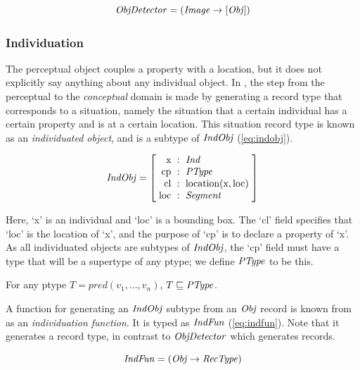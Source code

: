 \begin{equation}\label{eq:objdetector}
\mathit{ObjDetector} = ( \mathit{Image} \rightarrow [\mathit{Obj}] )
\end{equation}



\subsubsection{Individuation}

The perceptual object couples a property with a location, but it does not explicitly say anything about any individual object.
In \cite{lspc}, the step from the perceptual to the \textit{conceptual} domain is made by generating a record type that corresponds to a situation, namely the situation that a certain individual has a certain property and is at a certain location.
This situation record type is known as an \textit{individuated object}, and is a subtype of $\mathit{IndObj}$ (\autoref{eq:indobj}).

\begin{equation}\label{eq:indobj}
\type{IndObj} = \rec{
\text{x} &:& \type{Ind} \\
\text{cp} &:& \type{PType} \\
\text{cl} &:& \text{location}(\text{x}, \text{loc}) \\
\text{loc} &:& \type{Segment} \\
}
\end{equation}

Here, `x' is an individual and `loc' is a bounding box.
The `cl' field specifies that `loc' is the location of `x', and the purpose of `cp' is to declare a property of `x'.
As all individuated objects are subtypes of $\mathit{IndObj}$, the `cp' field must have a type that will be a supertype of any ptype; we define $\mathit{PType}$ to be this.

\begin{definition}
For any ptype $T = \mathit{pred}(v_1, ..., v_n)$, $T \sqsubseteq \mathit{PType}$.
\end{definition}

A function for generating an $\mathit{IndObj}$ subtype from an $\mathit{Obj}$ record is known from \cite{lspc} as an \textit{individuation function}.
It is typed as $\mathit{IndFun}$ (\autoref{eq:indfun}).
Note that it generates a record type, in contrast to $\mathit{ObjDetector}$ which generates records.

\begin{equation}\label{eq:indfun}
\mathit{IndFun} = ( \mathit{Obj} \rightarrow \mathit{RecType} )
\end{equation}


